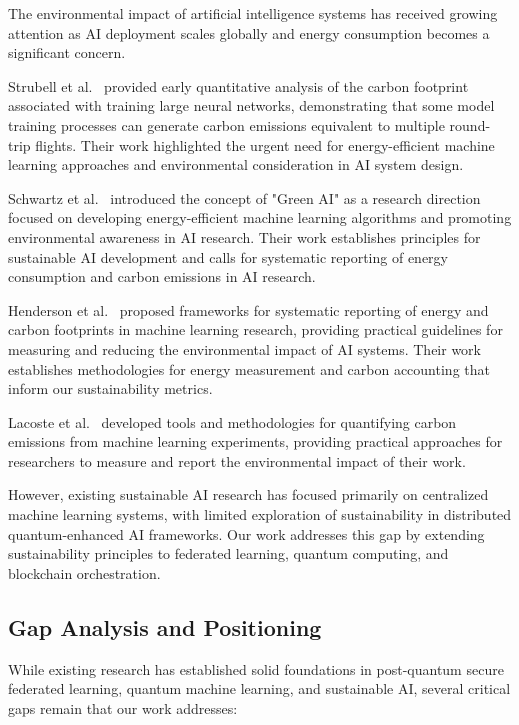 \documentclass[10pt,journal,compsoc]{IEEEtran}
\begin{document}
The environmental impact of artificial intelligence systems has received growing attention as AI deployment scales globally and energy consumption becomes a significant concern.

Strubell et al.~\cite{Strubell2019} provided early quantitative analysis of the carbon footprint associated with training large neural networks, demonstrating that some model training processes can generate carbon emissions equivalent to multiple round-trip flights. Their work highlighted the urgent need for energy-efficient machine learning approaches and environmental consideration in AI system design.

Schwartz et al.~\cite{Schwartz2020} introduced the concept of "Green AI" as a research direction focused on developing energy-efficient machine learning algorithms and promoting environmental awareness in AI research. Their work establishes principles for sustainable AI development and calls for systematic reporting of energy consumption and carbon emissions in AI research.

Henderson et al.~\cite{Henderson2020} proposed frameworks for systematic reporting of energy and carbon footprints in machine learning research, providing practical guidelines for measuring and reducing the environmental impact of AI systems. Their work establishes methodologies for energy measurement and carbon accounting that inform our sustainability metrics.

Lacoste et al.~\cite{Lacoste2019} developed tools and methodologies for quantifying carbon emissions from machine learning experiments, providing practical approaches for researchers to measure and report the environmental impact of their work.

However, existing sustainable AI research has focused primarily on centralized machine learning systems, with limited exploration of sustainability in distributed quantum-enhanced AI frameworks. Our work addresses this gap by extending sustainability principles to federated learning, quantum computing, and blockchain orchestration.

\subsection{Gap Analysis and Positioning}

While existing research has established solid foundations in post-quantum secure federated learning, quantum machine learning, and sustainable AI, several critical gaps remain that our work addresses:
\end{document}
